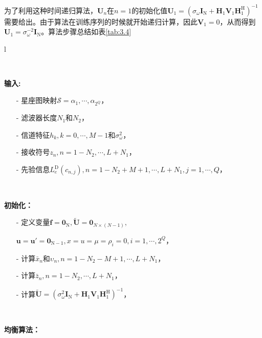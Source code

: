 为了利用这种时间递归算法，$\mathbf{U}_n$在$n=1$的初始化值$\mathbf{U}_1=(\sigma_{\omega}\mathbf{I}_{\mathrm{N}}+\mathbf{H}_1\mathbf{V}_1\mathbf{H}_1^{\mathrm{H}})^{-1}$需要给出。由于算法在训练序列的时候就开始递归计算，因此$\mathbf{V}_1=0$，从而得到$\mathbf{U}_1=\sigma_{\omega}^{-2}\mathbf{I}_{\mathrm{N}}$。算法步骤总结如表\ref{tab:3.4}
\begin{longtable}{l}
  \caption{MMSE-LE递归算法总结}
  \label{tab:3.4}\\

  \endfirsthead


  \endhead
  
  \hline
  \endfoot
  \endlastfoot
    \hline
    \begin{minipage}[tb]{15cm}
        \textbf{\xiaosan 输入:}
    \begin{itemize}
        \item[-]  星座图映射$\mathcal{S}={\alpha_1,\cdots,\alpha_{2^Q}}$，
        \item[-]  滤波器长度$N_1$和$N_2$，
        \item[-]  信道特征$h_k,k=0,\cdots,M-1$和$\sigma_{\omega}^2$，
        \item[-]  接收符号$z_n,n=1-N_2,\cdots,L+N_1$，
        \item[-]
            先验信息$L_e^{\mathrm{D}}(c_{n,j}),n=1-N_2+M+1,\cdots,L+N_1,j=1,\cdots,Q$，
    \end{itemize}
    \vspace{5mm}
\end{minipage}\\
    \hline
    \begin{minipage}[tb]{15cm}
        \textbf{\xiaosan 初始化：}
    \begin{itemize}
        \item[-]
            定义变量$\mathbf{f}=\mathbf{0}_{\mathrm{N}},\tilde{\mathbf{U}}=\mathbf{0}_{N\times(N-1)},$
            
            $\mathbf{u}={\mathbf{u}}'=\mathbf{0}_{\mathrm{N}-1},x=u=\mu=\rho_i=0,i=1,\cdots,2^Q$，
        \item[-]   计算$\bar{x}_n$和$\upsilon_n,n=1-N_2-M+1,\cdots,L+N_1$，
        \item[-]   计算$\bar{z}_n,n=1-N_2,\cdots,L+N_1$，
        \item[-]
            计算$\tilde{\mathbf{U}}=(\sigma_{\omega}^2\mathbf{I}_{\mathrm{N}}+\mathbf{H}_1\mathbf{V}_1\mathbf{H}_1^{\mathrm{H}})^{-1}$，
    \end{itemize}
    \vspace{5mm}
\end{minipage}\\
    \hline
    \begin{minipage}[tb]{15cm}
        \textbf{\xiaosan 均衡算法：}


\end{minipage}
\end{longtable}
